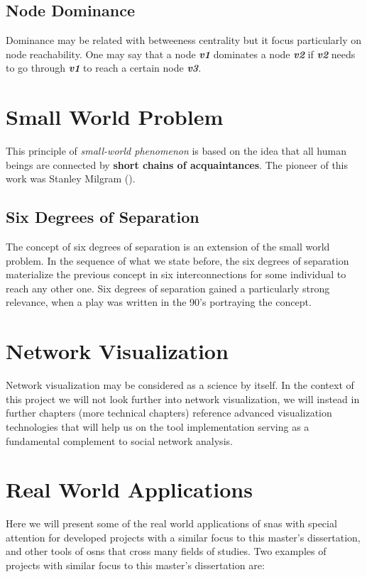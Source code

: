 \subsection{Node Dominance}
Dominance may be related with betweeness centrality but it focus particularly on node reachability. One may say that a node \textit{\textbf{v1}} dominates
a node \textit{\textbf{v2}} if \textit{\textbf{v2}} needs to go through \textit{\textbf{v1}} to reach a certain node \textit{\textbf{v3}}.

\section{Small World Problem}
This principle of \textit{small-world phenomenon} is based on the idea that all human beings are connected by \textbf{short chains of acquaintances}. The pioneer of this work was Stanley Milgram (\cite{travers1967small}).

\subsection*{Six Degrees of Separation}
The concept of six degrees of separation is an extension of the small world problem. In the sequence of what we state before, the six degrees of separation materialize the previous concept in six interconnections for some individual to reach any other one. Six degrees of separation gained a particularly strong relevance, when a play was written in the 90's portraying the concept.

\section{Network Visualization}
Network visualization may be considered as a science by itself. In the context of this project we will not look further into network visualization, we will instead
in further chapters (more technical chapters) reference advanced visualization technologies that will help us on the tool implementation serving as a fundamental complement to social network analysis.



\section{Real World Applications}
Here we will present some of the real world applications of \glspl{sna} with special attention for developed projects with a similar focus to this master's dissertation, and other tools of \glspl{osn} that cross many fields of studies. Two examples of projects with similar focus to this master's dissertation are:

